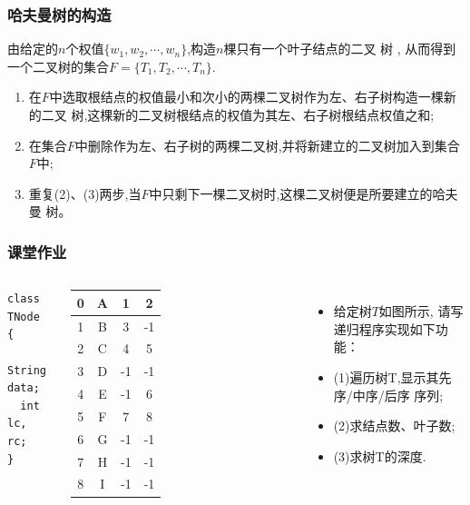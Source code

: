 \begin{frame}[fragile]
  \frametitle{哈夫曼树的构造}

  由给定的$n$个权值$\{w_1, w_2, \cdots, w_n\}$,构造$n$棵只有一个叶子结点的二叉
  树 , 从而得到一个二叉树的集合$F=\{T_1, T_2, \cdots, T_n\}$.

  \begin{enumerate}
  \item 在$F$中选取根结点的权值最小和次小的两棵二叉树作为左、右子树构造一棵新的二叉
    树,这棵新的二叉树根结点的权值为其左、右子树根结点权值之和;
  \item 在集合$F$中删除作为左、右子树的两棵二叉树,并将新建立的二叉树加入到集合
    $F$中;
  \item 重复(2)、(3)两步,当$F$中只剩下一棵二叉树时,这棵二叉树便是所要建立的哈夫曼
    树。
  \end{enumerate}
\end{frame}


\begin{frame}[fragile]
  \frametitle{课堂作业}
  \begin{columns}

    \begin{verbatim}
class TNode {
  String data;
  int lc, rc;
}
    \end{verbatim}

    \begin{tabular}{| c | c | c | c|}
      \hline
      0 & A & 1 & 2 \\ \hline
      1 & B & 3 & -1 \\ \hline
      2 & C & 4 & 5 \\ \hline
      3 & D & -1 & -1 \\ \hline
      4 & E & -1 & 6 \\ \hline
      5 & F & 7 & 8 \\ \hline
      6 & G & -1 & -1 \\ \hline
      7 & H & -1 & -1 \\ \hline
      8 & I & -1 & -1 \\ \hline
    \end{tabular}

    \begin{itemize}
    \item 给定树$T$如图所示, 请写递归程序实现如下功能：
    \item (1)遍历树T,显示其先序/中序/后序 序列;
    \item (2)求结点数、叶子数;
    \item (3)求树T的深度.
    \end{itemize}
  \end{columns}
\end{frame}

